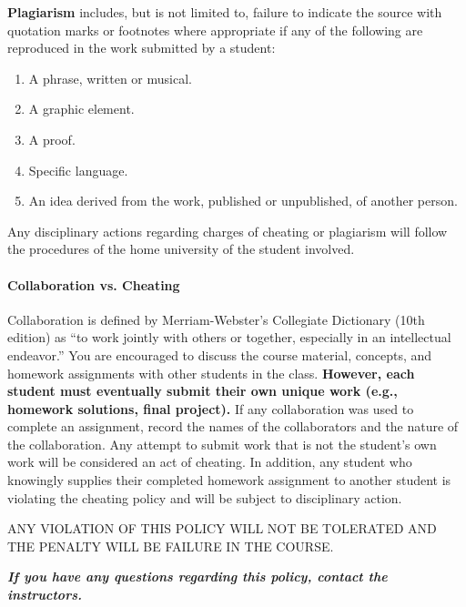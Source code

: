 \textbf{Plagiarism} includes, but is not limited to, failure to indicate the source with quotation marks or footnotes where appropriate if any of the following are reproduced in the work submitted by a student:
\begin{enumerate}
\item A phrase, written or musical.
\item A graphic element.
\item A proof.
\item Specific language.
\item An idea derived from the work, published or unpublished, of another person.
\end{enumerate}
Any disciplinary actions regarding charges of cheating or plagiarism will follow the procedures of the home university of the student involved.
 
\paragraph{Collaboration vs. Cheating}
\label{sec:collaboration}
Collaboration is defined by Merriam-Webster’s Collegiate Dictionary (10th edition) as 
“to work jointly with others or together, especially in an intellectual endeavor.” 
You are encouraged to discuss the course material, concepts, and homework assignments with other students in the class. 
\textbf{However, each student must eventually submit their own unique work (e.g., homework solutions, final project). }
If any collaboration was used to complete an assignment, 
record the names of the collaborators and the nature of the collaboration. 
Any attempt to submit work that is not the student’s own work will be considered an act of cheating. 
In addition, any student who knowingly supplies their completed homework assignment 
to another student is violating the cheating policy and will be subject to disciplinary action.
 
 \begin{tcolorbox}[colback=red!5,colframe=red!75!black]
ANY VIOLATION OF THIS POLICY WILL NOT BE TOLERATED AND THE PENALTY WILL BE FAILURE IN THE COURSE.
\end{tcolorbox}
 
\textbf{\textit{If you have any questions regarding this policy, contact the instructors.}}

